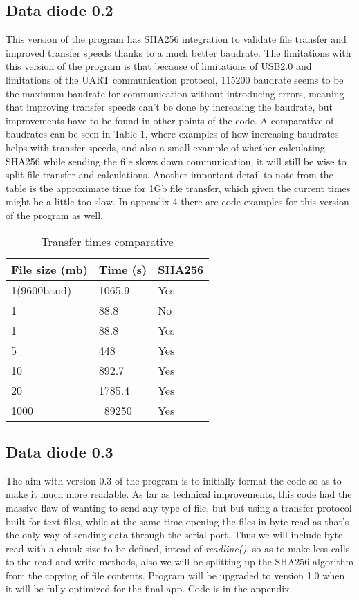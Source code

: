 \documentclass[a4paper,11pt]{scrartcl}
\begin{document}
\subsection{Data diode 0.2}
This version of the program has SHA256 integration to validate file transfer and improved transfer speeds thanks to a much better baudrate. 
The limitations with this version of the program is that because of limitations of USB2.0 and limitations of the UART communication protocol, 115200 baudrate seems to be the maximum baudrate for communication without introducing errors, meaning that improving transfer speeds can't be done by increasing the baudrate, but improvements have to be found in other points of the code. 
A comparative of baudrates can be seen in Table 1, where examples of how increasing baudrates helps with transfer speeds, and also a small example of whether calculating SHA256 while sending the file slows down communication, it will still be wise to split file transfer and calculations. Another important detail to note from the table is the approximate time for 1Gb file transfer, which given the current times might be a little too slow. In appendix 4 there are code examples for this version of the program as well.

\begin{table}[h!]
    \begin{tabular}{@{}|l|l|l|@{}}
        \toprule
        File size (mb) & Time (s) & SHA256 \\ \midrule
        1(9600baud)    & 1065.9   & Yes    \\ \midrule
        1              & 88.8     & No     \\ \midrule
        1              & 88.8     & Yes    \\ \midrule
        5              & 448      & Yes    \\ \midrule
        10             & 892.7    & Yes    \\ \midrule
        20             & 1785.4   & Yes    \\ \midrule
        1000           & ~89250   & Yes    \\ \bottomrule
    \end{tabular}
    \caption{Transfer times comparative}
    \label{tab:table 1}
\end{table}

\subsection{Data diode 0.3}
The aim with version 0.3 of the program is to initially format the code so as to make it much more readable. As far as technical improvements, this code had the massive flaw of wanting to send any type of file, but but using a transfer protocol built for text files, while at the same time opening the files in byte read as that's the only way of sending data through the serial port. Thus we will include byte read with a chunk size to be defined, intead of \textit{readline()}, so as to make less calls to the read and write methods, also we will be splitting up the SHA256 algorithm from the copying of file contents. Program will be upgraded to version 1.0 when it will be fully optimized for the final app. Code is in the appendix.
\end{document}
